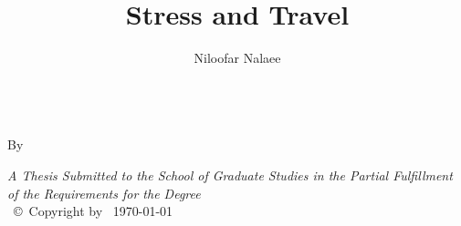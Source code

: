 \documentclass[
11pt, %
oneside, %
english, %
singlespacing, %
]{macthesis} %
\title{Stress and Travel}
\author{Niloofar Nalaee}
\date{}
\def\blankpage{%
      \clearpage%
      \thispagestyle{empty}%
      \addtocounter{page}{-1}%
      \null%
      \clearpage}
\begin{document}
\sloppy

\frontmatter %

\pagestyle{plain} %

\vspace{6cm}
\begin{center}
\ttitle
\end{center}
\clearpage

\begin{center}

\vfill
\textsc{\Large \ttitle} \\

\vfill
{By \authorname\, \bdeg }


 \vfill
{\large \textit{A Thesis Submitted to the School of Graduate Studies in the Partial Fulfillment of the Requirements for the Degree \degreename}}\\

\vfill
{\large \univname\, \copyright\, Copyright by \authorname\, \today}\\[4cm] %

\end{center}
\blankpage
\clearpage


\vspace*{0.2\textheight}

\bigbreak
\end{document}
